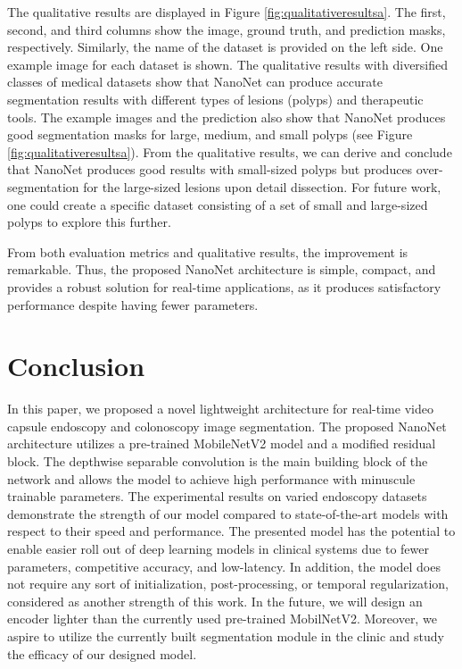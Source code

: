 \documentclass[journal]{IEEEtran}
\begin{document}
The qualitative results are displayed in Figure \ref{fig:qualitativeresultsa}. The first, second, and third columns show the image, ground truth, and prediction masks, respectively. Similarly, the name of the dataset is provided on the left side. One example image for each dataset is shown.  The qualitative results with diversified classes of medical datasets show that NanoNet can produce accurate segmentation results with different types of lesions (polyps) and therapeutic tools. The example images and the prediction also show that NanoNet produces good segmentation masks for large, medium, and small polyps (see Figure \ref{fig:qualitativeresultsa}). From the qualitative results,  we can derive and conclude that NanoNet produces good results with small-sized polyps but produces over-segmentation for the large-sized lesions upon detail dissection. For future work, one could create a specific dataset consisting of a set of small and large-sized polyps to explore this further.

From both evaluation metrics and qualitative results, the improvement is remarkable.  Thus, the proposed NanoNet architecture is simple, compact, and provides a robust solution for real-time applications, as it produces satisfactory performance despite having fewer parameters.

\section{Conclusion}
\label{sec:conclusion}
In this paper, we proposed a novel lightweight architecture for real-time video capsule endoscopy and colonoscopy image segmentation. The proposed NanoNet architecture utilizes a pre-trained MobileNetV2 model and a modified residual block. The depthwise separable convolution is the main building block of the network and allows the model to achieve high performance with minuscule trainable parameters. The experimental results on varied endoscopy datasets demonstrate the strength of our model compared to state-of-the-art models with respect to their speed and performance. The presented model has the potential to enable easier roll out of deep learning models in clinical systems due to fewer parameters, competitive accuracy, and low-latency. In addition, the model does not require any sort of initialization, post-processing, or temporal regularization, considered as another strength of this work. In the future, we will design an encoder lighter than the currently used pre-trained MobilNetV2. Moreover, we aspire to utilize the currently built segmentation module in the clinic and study the efficacy of our designed model.
\end{document}

